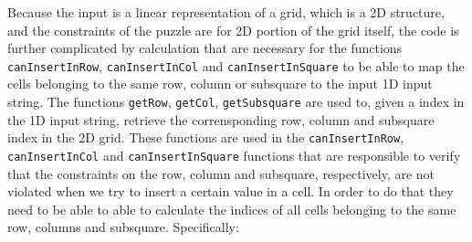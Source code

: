 Because the input is a linear representation of a grid, which is a 2D structure, and the constraints
of the puzzle are for 2D portion of the grid itself, the code is further complicated by calculation
that are necessary for the functions \lstinline[columns=fixed]{canInsertInRow},
\lstinline[columns=fixed]{canInsertInCol} and \lstinline[columns=fixed]{canInsertInSquare} to be
able to map the cells belonging to the same row, column or subsquare to the input 1D input string.
The functions \lstinline[columns=fixed]{getRow}, \lstinline[columns=fixed]{getCol},
\lstinline[columns=fixed]{getSubsquare} are used to, given a index in the 1D input string, retrieve
the corrensponding row, column and subsquare index in the 2D grid. These functions are used in the
\lstinline[columns=fixed]{canInsertInRow}, \lstinline[columns=fixed]{canInsertInCol} and
\lstinline[columns=fixed]{canInsertInSquare} functions that are responsible to verify that the
constraints on the row, column and subsquare, respectively, are not violated when we try to insert a
certain value in a cell. In order to do that they need to be able to able to calculate the indices
of all cells belonging to the same row, columns and subsquare. Specifically:
